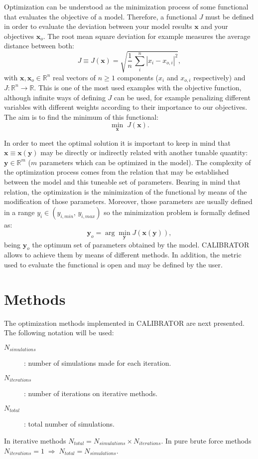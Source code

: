 \documentclass[review,authoryear]{elsarticle}
\newcommand{\EQ}[2]
{\begin{equation}#1\label{#2}\end{equation}}
\newcommand{\ABS}[1]{\left|#1\right|}
\newcommand{\PA}[1]{\left(#1\right)}
\begin{document}
Optimization can be understood as the minimization process of some functional
that evaluates the objective of a model. Therefore, a functional $J$ must be
defined in order to evaluate the deviation between your model results
$\mathbf{x}$ and your objectives $\mathbf{x}_o$. The root mean square deviation
for example measures the average distance between both:
\EQ
{
	J \equiv J\PA{\mathbf{x}}
	=\sqrt{\frac{1}{n}\,\sum_i^n\ABS{x_i-x_{o,i}}^2},
}{EqRMSD}
with $\mathbf{x},\mathbf{x}_o\in\mathbb{R}^n$ real vectors of $n\ge 1$
components ($x_i$ and $x_{o,i}$ respectively) and
$J:\mathbb{R}^n \rightarrow \mathbb{R}$. 
This is one of the most used examples with the objective function, although 
infinite ways of defining $J$ can be used, for example penalizing different
variables with different weights according to their importance to our
objectives. The aim is to find the minimum of this functional:
\EQ{\min_{\mathbf{x}}\;J\PA{\mathbf{x}}.}{EqFunctionalMin}

In order to meet the optimal solution it is important to keep in mind that
$\mathbf{x}\equiv\mathbf{x}\PA{\mathbf{y}}$ may be directly or indirectly
related with another tunable quantity: $\mathbf{y}\in\mathbb{R}^m$  ($m$
parameters which can be optimized in the model). The complexity of the
optimization process comes from the relation that may be established between the
model and this tuneable set of parameters. Bearing in mind that relation, the
optimization is the minimization of the functional by means of the modification
of those parameters. Moreover, those parameters are usually defined in a range
$y_i\in\PA{y_{i,min},\,y_{i,max}}$ so the minimization problem is formally
defined as:
\EQ
{
	\mathbf{y}_o=\arg\min_{\mathbf{y}}J\PA{\mathbf{x}\PA{\mathbf{y}}},
}{EqParametersOptimal}
being $\mathbf{y}_o$ the optimum set of parameters obtained by the model.
CALIBRATOR allows to achieve them by means of different methods. In addition,
the metric used to evaluate the functional is open and may be defined by the
user.

\section{Methods}

The optimization methods implemented in CALIBRATOR are next presented. The following notation will be used:
\begin{description}
	\item[$N_{simulations}$]: number of simulations made for each iteration.
	\item[$N_{iterations}$]: number of iterations on iterative methods.
	\item[$N_{total}$]: total number of simulations.
\end{description}
In iterative methods $N_{total}=N_{simulations}\times N_{iterations}$.
In pure brute force methods
$N_{iterations}=1\;\Rightarrow\;N_{total}=N_{simulations}$.
\end{document}

